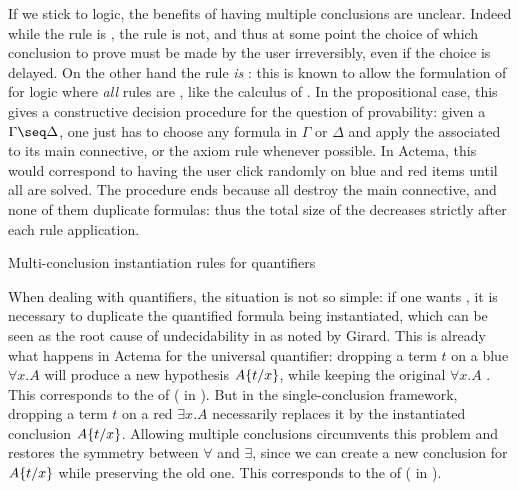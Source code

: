 \begin{scope}
If we stick to  logic, the benefits of having multiple conclusions
are unclear. Indeed while the {} rule is , the
{} rule is not, and thus at some point the choice of which
conclusion to prove must be made by the user irreversibly, even if the choice is
delayed. On the other hand the
{} rule \emph{is} : this is known to allow the
formulation of  for  logic where \emph{all} rules are
, like the  calculus of . In
the propositional case, this gives a constructive decision procedure for the
question of provability: given a  $\Gamma \seq \Delta$, one just has to
choose any formula in $\Gamma$ or $\Delta$ and apply the 
associated to its main connective, or the axiom rule whenever possible. In
Actema, this would correspond to having the user click randomly on blue and red
items until all  are solved. The procedure ends because all  destroy the main connective, and none of them duplicate formulas: thus the
total size of the  decreases strictly after each rule application.

\begin{marginfigure}
  \caption{Multi-conclusion instantiation rules for quantifiers}
\end{marginfigure}

When dealing with quantifiers, the situation is not so simple: if one wants
 , it is necessary to duplicate the quantified
formula being instantiated, which can be seen as the root cause of
undecidability in  as noted by
Girard\cite[Section~3.3.2]{girard:hal-01322183}. This is already what happens in
Actema for the universal quantifier: dropping a term $t$ on a blue  $\forall
x. A$ will produce a new hypothesis $A \{ t / x \}$, while keeping the
original $\forall x. A$ . This corresponds to the 
 of  ({} in ).
But in the single-conclusion framework, dropping a term $t$ on a red 
$\exists x. A$ necessarily replaces it by the instantiated conclusion
$A \{ t / x \}$. Allowing multiple conclusions circumvents this problem and
restores the symmetry between $\forall$ and $\exists$, since we can create a new
conclusion for $A \{ t / x \}$ while preserving the old one. This corresponds
to the   of  ({} in
).


\end{scope}
